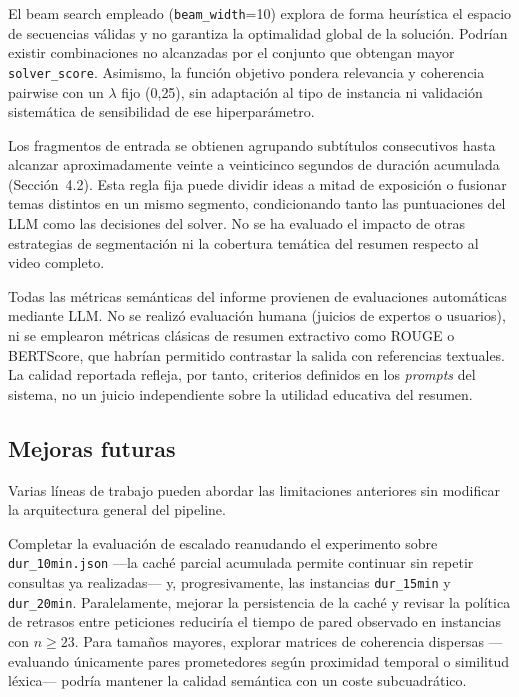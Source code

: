 \documentclass[12pt,a4paper]{article}
\begin{document}
El beam search empleado (\texttt{beam\_width}=10) explora de forma heurística el espacio de secuencias válidas y no garantiza la optimalidad global de la solución. Podrían existir combinaciones no alcanzadas por el conjunto que obtengan mayor \texttt{solver\_score}. Asimismo, la función objetivo pondera relevancia y coherencia pairwise con un \(\lambda\) fijo (0{,}25), sin adaptación al tipo de instancia ni validación sistemática de sensibilidad de ese hiperparámetro.

Los fragmentos de entrada se obtienen agrupando subtítulos consecutivos hasta alcanzar aproximadamente veinte a veinticinco segundos de duración acumulada (Sección~4.2). Esta regla fija puede dividir ideas a mitad de exposición o fusionar temas distintos en un mismo segmento, condicionando tanto las puntuaciones del LLM como las decisiones del solver. No se ha evaluado el impacto de otras estrategias de segmentación ni la cobertura temática del resumen respecto al video completo.

Todas las métricas semánticas del informe provienen de evaluaciones automáticas mediante LLM. No se realizó evaluación humana (juicios de expertos o usuarios), ni se emplearon métricas clásicas de resumen extractivo como ROUGE o BERTScore, que habrían permitido contrastar la salida con referencias textuales. La calidad reportada refleja, por tanto, criterios definidos en los \textit{prompts} del sistema, no un juicio independiente sobre la utilidad educativa del resumen.


\subsection{Mejoras futuras}

Varias líneas de trabajo pueden abordar las limitaciones anteriores sin modificar la arquitectura general del pipeline.


Completar la evaluación de escalado reanudando el experimento sobre \linebreak\texttt{dur\_10min.json} ---la caché parcial acumulada permite continuar sin repetir consultas ya realizadas--- y, progresivamente, las instancias \texttt{dur\_15min} y \texttt{dur\_20min}. Paralelamente, mejorar la persistencia de la caché y revisar la política de retrasos entre peticiones reduciría el tiempo de pared observado en instancias con \(n \geq 23\). Para tamaños mayores, explorar matrices de coherencia dispersas ---evaluando únicamente pares prometedores según proximidad temporal o similitud léxica--- podría mantener la calidad semántica con un coste subcuadrático.
\end{document}
